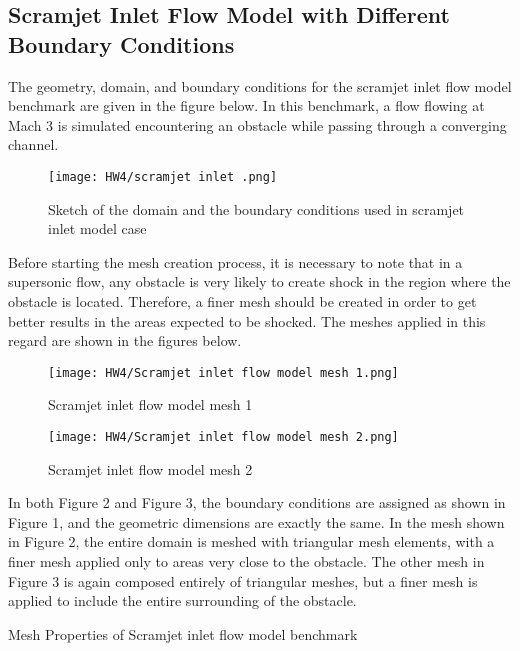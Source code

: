 \documentclass[a4paper, 12pt]{article}
\begin{document}
\subsection{Scramjet Inlet Flow Model with Different Boundary Conditions}
The geometry, domain, and boundary conditions for the scramjet inlet flow model benchmark are given in the figure below. In this benchmark, a flow flowing at Mach 3 is simulated encountering an obstacle while passing through a converging channel.

\begin{figure}[H]
    \centering
    \texttt{[image: HW4/scramjet inlet .png]}
    \caption{Sketch of the domain and the boundary conditions used in scramjet inlet model case}
\end{figure}

Before starting the mesh creation process, it is necessary to note that in a supersonic flow, any obstacle is very likely to create shock in the region where the obstacle is located. Therefore, a finer mesh should be created in order to get better results in the areas expected to be shocked. The meshes applied in this regard are shown in the figures below. 

\begin{figure}[H]
    \centering
    \texttt{[image: HW4/Scramjet inlet flow model mesh 1.png]}
    \caption{Scramjet inlet flow model mesh 1}
\end{figure}

\begin{figure}[H]
    \centering
    \texttt{[image: HW4/Scramjet inlet flow model mesh 2.png]}
    \caption{Scramjet inlet flow model mesh 2}
\end{figure}

In both Figure 2 and Figure 3, the boundary conditions are assigned as shown in Figure 1, and the geometric dimensions are exactly the same. In the mesh shown in Figure 2, the entire domain is meshed with triangular mesh elements, with a finer mesh applied only to areas very close to the obstacle. The other mesh in Figure 3 is again composed entirely of triangular meshes, but a finer mesh is applied to include the entire surrounding of the obstacle.

\begin{table}[H]
    \renewcommand\baselinestretch{1.1}\selectfont
    \centering
    \mbox{}
    \caption{Mesh Properties of Scramjet inlet flow model benchmark}
\end{table}
\end{document}
